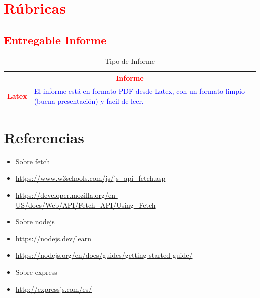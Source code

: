 \documentclass{article}
\begin{document}
	





\clearpage

	\section{\textcolor{red}{Rúbricas}}
	
	\subsection{\textcolor{red}{Entregable Informe}}
	\begin{table}[H]
		\caption{Tipo de Informe}
		\setlength{\tabcolsep}{0.5em} %
		{\renewcommand{\arraystretch}{1.5}%
		\begin{tabular}{|p{3cm}|p{12cm}|}
			\hline
			\multicolumn{2}{|c|}{\textbf{\textcolor{red}{Informe}}}  \\
			\hline 
			\textbf{\textcolor{red}{Latex}} & \textcolor{blue}{El informe está en formato PDF desde Latex,  con un formato limpio (buena presentación) y facil de leer.}   \\ 
			\hline 
			
			
		\end{tabular}
	}
	\end{table}
	
	\clearpage
	
	
	
\clearpage

\section{Referencias}
\begin{itemize}		
	\item Sobre fetch	
	\item \url{https://www.w3schools.com/js/js_api_fetch.asp}
	\item \url{https://developer.mozilla.org/en-US/docs/Web/API/Fetch_API/Using_Fetch}
	\item Sobre nodejs
	\item \url{https://nodejs.dev/learn}
	\item \url{https://nodejs.org/en/docs/guides/getting-started-guide/}
	\item Sobre express
	\item \url{http://expressjs.com/es/}
\end{itemize}	
	
%
%
%
\end{document}
